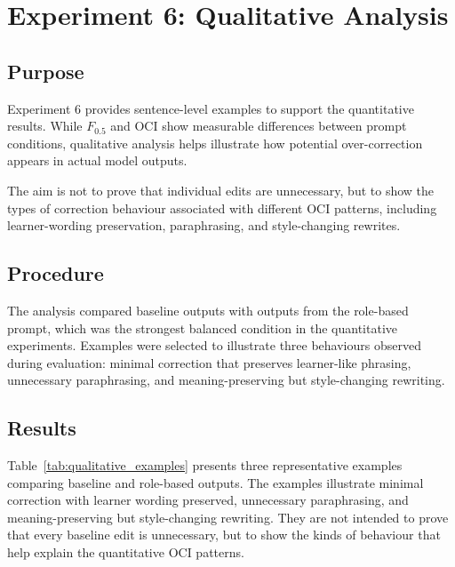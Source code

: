 \section{Experiment 6: Qualitative Analysis}

\subsection{Purpose}

Experiment 6 provides sentence-level examples to support the quantitative results. While $F_{0.5}$ and OCI show measurable differences between prompt conditions, qualitative analysis helps illustrate how potential over-correction appears in actual model outputs.

The aim is not to prove that individual edits are unnecessary, but to show the types of correction behaviour associated with different OCI patterns, including learner-wording preservation, paraphrasing, and style-changing rewrites.

\subsection{Procedure}

The analysis compared baseline outputs with outputs from the role-based prompt, which was the strongest balanced condition in the quantitative experiments. Examples were selected to illustrate three behaviours observed during evaluation: minimal correction that preserves learner-like phrasing, unnecessary paraphrasing, and meaning-preserving but style-changing rewriting.

\subsection{Results}

Table~\ref{tab:qualitative_examples} presents three representative examples comparing baseline and role-based outputs. The examples illustrate minimal correction with learner wording preserved, unnecessary paraphrasing, and meaning-preserving but style-changing rewriting. They are not intended to prove that every baseline edit is unnecessary, but to show the kinds of behaviour that help explain the quantitative OCI patterns.

